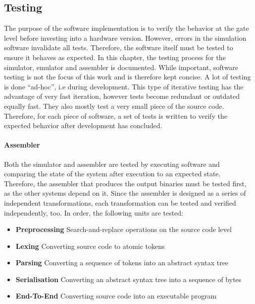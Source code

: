 \subsection{Testing} \label{sec:testing}

The purpose of the software implementation is to verify the behavior at the gate level before investing into a hardware version. However, errors in the simulation software invalidate all tests. Therefore, the software itself must be tested to ensure it behaves as expected. In this chapter, the testing process for the simulator, emulator and assembler is documented. While important, software testing is not the focus of this work and is therefore kept concise. A lot of testing is done ``ad-hoc'', i.e during development. This type of iterative testing has the advantage of very fast iteration, however tests become redundant or outdated equally fast. They also mostly test a very small piece of the source code. Therefore, for each piece of software, a set of tests is written to verify the expected behavior after development has concluded.

\paragraph*{Assembler}

Both the simulator and assembler are tested by executing software and comparing the state of the system after execution to an expected state. Therefore, the assembler that produces the output binaries must be tested first, as the other systems depend on it. Since the assembler is designed as a series of independent transformations, each transformation can be tested and verified independently, too. In order, the following units are tested:

\begin{itemize}
    \item \textbf{Preprocessing} Search-and-replace operations on the source code level
    \item \textbf{Lexing} Converting source code to atomic tokens
    \item \textbf{Parsing} Converting a sequence of tokens into an abstract syntax tree
    \item \textbf{Serialisation} Converting an abstract syntax tree into a sequence of bytes
    \item \textbf{End-To-End} Converting source code into an executable program
\end{itemize}

